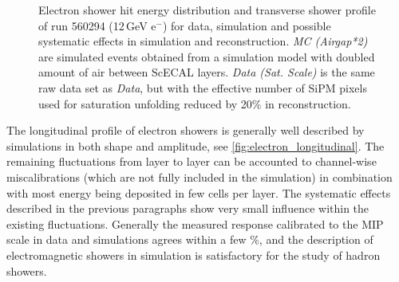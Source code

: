 \documentclass[twoside,a4paper,12pt]{article}
\newcommand\eminus{\(\mathrm{e^-}\)}
\begin{document}
\begin{figure}[htbp]
	\hfill
	
	\caption{Electron shower hit energy distribution and transverse shower profile of run 560294 (12\,GeV \eminus) for data, simulation and possible systematic effects in simulation and reconstruction. \emph{MC (Airgap*2)} are simulated events obtained from a simulation model with doubled amount of air between ScECAL layers. \emph{Data (Sat. Scale)} is the same raw data set as \emph{Data}, but with the effective number of SiPM pixels used for saturation unfolding reduced by 20\% in reconstruction. }
	\label{fig:electron_profiles}
\end{figure}

The longitudinal profile of electron showers is generally well described by simulations in both shape and amplitude, see \autoref{fig:electron_longitudinal}. The remaining fluctuations from layer to layer can be accounted to channel-wise miscalibrations (which are not fully included in the simulation) in combination with most energy being deposited in few cells per layer. The systematic effects described in the previous paragraphs show very small influence within the existing fluctuations. Generally the measured response calibrated to the MIP scale in data and simulations agrees within a few \%, and the description of electromagnetic showers in simulation is satisfactory for the study of hadron showers.
\end{document}
